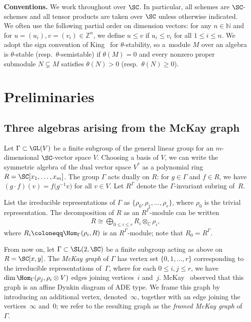 \noindent
\textbf{Conventions.}
 We work throughout over $\SC$. In particular, all schemes are $\SC$-schemes and all tensor products are taken over $\SC$ unless otherwise indicated. We often use the following partial order on dimension vectors: for any $n\in \mathbb{N}$ and for $u=(u_i),v=(v_i)\in \mathbb{Z}^n$, we define $u\le v$ if $u_i\le v_i$ for all $1\leq i\leq n$. We adopt the sign convention of King~\cite{king1994moduli} for $\theta$-stability, so a~module $M$ over an algebra is $\theta$-stable (resp.\ $\theta$-semistable) if $\theta(M)=0$ and every nonzero proper submodule $N\subsetneq M$ satisfies $\theta(N)>0$ (resp.\ $\theta(N)\ge 0$).

\section{Preliminaries}\label{sec:prelim}

\subsection{Three algebras arising from the McKay graph}\label{subsec:mckay}
Let $\Gamma\subset \GL(V)$ be a finite subgroup of the general linear group for an $m$-dimensional $\SC$-vector space $V$.
Choosing a basis of $V$, we can write the symmetric algebra of the dual vector space $V^*$ as a polynomial ring $R=\SC[x_1,\dots,x_m]$. The group $\Gamma$ acts dually on $R$: for $g\in \Gamma$ and $f\in R$, we have $(g\cdot f)(v) = f\big(g^{-1} v\big)$ for all $v\in V$. Let $R^\Gamma$ denote the $\Gamma$-invariant subring of~$R$.

List the irreducible representations of $\Gamma$ as $\{\rho_0, \rho_1, \dots, \rho_r\}$, where $\rho_0$ is the trivial representation.
The decomposition of $R$ as an $R^\Gamma$-module can be written \cite[Proposition~4.1.15]{goodman2009symmetry}
 \begin{gather*} %
 R\cong \bigoplus_{0\leq i\leq r} R_i\otimes_\mathbb{C} \rho_i,
 \end{gather*}
 where $R_i\coloneqq \Hom_\Gamma(\rho_i,R)$ is an
 $R^\Gamma$-module; note that $R_0=R^{\Gamma}$.

From now on, let $\Gamma \subset \SL(2,\SC)$ be a finite subgroup acting as above on $R=\SC[x,y]$. The \emph{McKay graph} of $\Gamma$
has vertex set $\{0,1, \dots, r\}$ corresponding to the irreducible representations of~$\Gamma$, where for each $0\leq i, j\leq r$, we have $\dim\Hom_{\Gamma}(\rho_j , \rho_i \otimes V )$ edges joining vertices~$i$ and~$j$. McKay~\cite{McKay80} observed that this graph is an affine Dynkin diagram of ADE type. We frame this graph by introducing an additional vertex, denoted~$\infty$, together with an edge joining the vertices~$\infty$ and~$0$; we refer to the resulting graph as the \emph{framed McKay graph} of~$\Gamma$.

